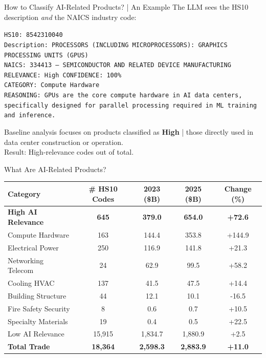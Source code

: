 \documentclass[11pt,pdftex,aspectratio=1610]{beamer}
\begin{document}
\begin{frame}[t]{How to Classify AI-Related Products? | An Example}
The LLM sees the HS10 description \emph{and} the NAICS industry code:\\
{\tiny
\begin{tcolorbox}[colback=gray!5!white, colframe=gray!50!white, boxrule=0.5pt, top=3mm, bottom=3mm, left=3mm, right=3mm]
{\small
\texttt{HS10: 8542310040}\\
\texttt{Description: PROCESSORS (INCLUDING MICROPROCESSORS): GRAPHICS PROCESSING UNITS (GPUS)}\\
\texttt{NAICS: 334413 --- SEMICONDUCTOR AND RELATED DEVICE MANUFACTURING}\\[6pt]
\texttt{RELEVANCE: High \quad CONFIDENCE: 100\%}\\
\texttt{CATEGORY: Compute Hardware}\\
\texttt{REASONING: GPUs are the core compute hardware in AI data centers, specifically designed for parallel processing required in ML training and inference.}
}
\end{tcolorbox}}
\bigskip
Baseline analysis focuses on products classified as \textbf{High} | those directly used in data center construction or operation.\\
\medskip
Result: \highAiHsCodes{} High-relevance codes out of \totalTradeHsCodes{} total.
\end{frame}


\begin{frame}[t]{What Are AI-Related Products?}
\smallskip
\begin{table}[t]
\centering
\setlength{\tabcolsep}{2.25mm}
\renewcommand{\arraystretch}{1.0}
\begin{tabular}{lcccc}
\toprule
Category & \# HS10 Codes & 2023 (\$B) & 2025 (\$B) & Change (\%) \\
\midrule
\textbf{High AI Relevance} & \textbf{645} & \textbf{379.0} & \textbf{654.0} & \textbf{+72.6} \\
\quad Compute Hardware & 163 & 144.4 & 353.8 & +144.9 \\
\quad Electrical Power & 250 & 116.9 & 141.8 & +21.3 \\
\quad Networking Telecom & 24 & 62.9 & 99.5 & +58.2 \\
\quad Cooling HVAC & 137 & 41.5 & 47.5 & +14.4 \\
\quad Building Structure & 44 & 12.1 & 10.1 & -16.5 \\
\quad Fire Safety Security & 8 & 0.6 & 0.7 & +10.5 \\
\quad Specialty Materials & 19 & 0.4 & 0.5 & +22.5 \\
\midrule
Low AI Relevance & 15,915 & 1,834.7 & 1,880.9 & +2.5 \\
\midrule
\textbf{Total Trade} & \textbf{18,364} & \textbf{2,598.3} & \textbf{2,883.9} & \textbf{+11.0} \\
\bottomrule
\end{tabular}
\end{table}
\end{frame}
\end{document}
